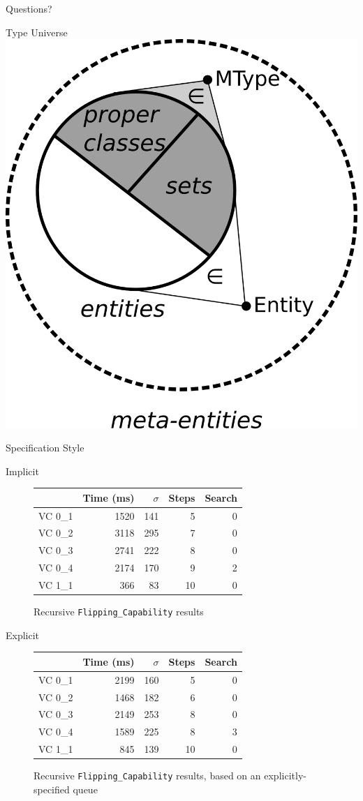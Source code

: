 \documentclass{beamer}
\begin{document}
\begin{frame}{Questions?}
~
\end{frame}

\begin{frame}{Type Universe}
	\centering
	\includegraphics[width=.5\textwidth]{../universe}
\end{frame}

\begin{frame}{Specification Style}
	
\end{frame}

\begin{frame}{Implicit}
	\begin{figure}
	\centering
	\begin{tabular}{lrrrr}
		\toprule
			& Time (ms)	& $\sigma$& Steps & Search \\
		\midrule
		VC 0\_1	& 1520		& 141	& 5 	& 0     \\
		VC 0\_2	& 3118		& 295	& 7 	& 0     \\
		VC 0\_3	& 2741		& 222	& 8 	& 0     \\
		VC 0\_4	& 2174		& 170	& 9 	& 2     \\
		VC 1\_1	& 366		& 83	& 10	& 0     \\
		\bottomrule
	\end{tabular}
	\caption{Recursive \texttt{Flipping\_Capability} results\label{fig:flippingResults}}
\end{figure}
\end{frame}

\begin{frame}{Explicit}
	\begin{figure}
	\centering
	\begin{tabular}{lrrrr}
		\toprule
			& Time (ms)	& $\sigma$& Steps & Search \\
		\midrule
		VC 0\_1	& 2199		& 160	& 5 	& 0     \\
		VC 0\_2	& 1468		& 182	& 6 	& 0     \\
		VC 0\_3	& 2149		& 253	& 8 	& 0     \\
		VC 0\_4	& 1589		& 225	& 8 	& 3     \\
		VC 1\_1	& 845		& 139	& 10	& 0     \\
		\bottomrule
	\end{tabular}
	\caption{Recursive \texttt{Flipping\_Capability} results, based on an explicitly-specified queue\label{fig:explicitFlippingResults}}
\end{figure}
\end{frame}
\end{document}
